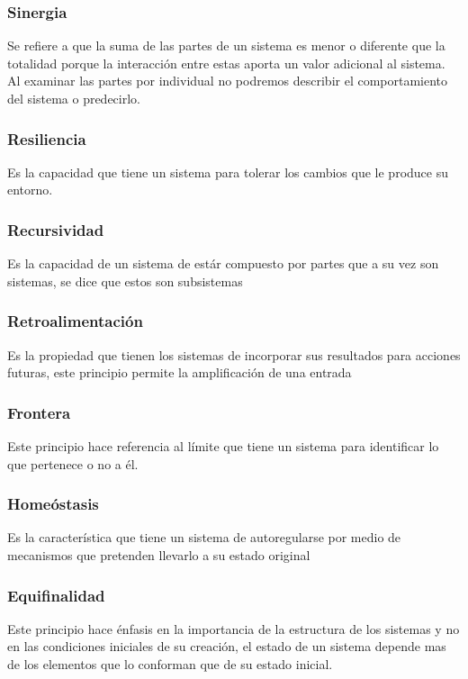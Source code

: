 \documentclass[a4paper,man,natbib]{apa6}
\begin{document}
\subsubsection{Sinergia}
Se refiere a que la suma de las partes de un sistema es menor o diferente que la totalidad porque la interacción entre estas aporta un valor adicional al sistema. Al examinar las partes por individual no podremos describir el comportamiento del sistema o predecirlo.\citep{10.2307/j.ctv1228hsw}

\subsubsection{Resiliencia}
Es la capacidad que tiene un sistema para tolerar los cambios que le produce su entorno.

\subsubsection{Recursividad}
Es la capacidad de un sistema de estár compuesto por partes que a su vez son sistemas, se dice que estos son subsistemas \citep{10.2307/j.ctv1228hsw}

\subsubsection{Retroalimentación}
Es la propiedad que tienen los sistemas de incorporar sus resultados para acciones futuras, este principio permite la amplificación de una entrada \citep{10.2307/j.ctv1228hsw}

\subsubsection{Frontera}
Este principio hace referencia al límite que tiene un sistema para identificar lo que pertenece o no a él. 

\subsubsection{Homeóstasis}
Es la característica que tiene un sistema de autoregularse por medio de mecanismos que pretenden llevarlo a su estado original \citep{10.2307/j.ctv1228hsw}

\subsubsection{Equifinalidad}
Este principio hace énfasis en la importancia de la estructura de los sistemas y no en las condiciones iniciales de su creación, el estado de un sistema depende mas de los elementos que lo conforman que de su estado inicial. \citep{ossa}
\end{document}
